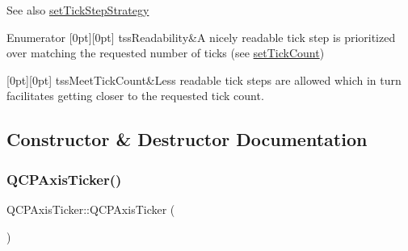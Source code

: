 \begin{DoxySeeAlso}{See also}
\mbox{\hyperlink{class_q_c_p_axis_ticker_a73b1d847c1a12159af6bfda4ebebe7d5}{set\+Tick\+Step\+Strategy}} 
\end{DoxySeeAlso}
\begin{DoxyEnumFields}{Enumerator}
[0pt][0pt]{}\mbox{\label{class_q_c_p_axis_ticker_ab6d2f9d9477821623ac9bc4b21ddf49aa9002aa2fd5633ab5556c71a26fed63a8}} 
tss\+Readability&A nicely readable tick step is prioritized over matching the requested number of ticks (see \mbox{\hyperlink{class_q_c_p_axis_ticker_a47752abba8293e6dc18491501ae34008}{set\+Tick\+Count}}) \\
\hline

[0pt][0pt]{}\mbox{\label{class_q_c_p_axis_ticker_ab6d2f9d9477821623ac9bc4b21ddf49aa770312b6b9b0c64a37ceeba96e0cd7f2}} 
tss\+Meet\+Tick\+Count&Less readable tick steps are allowed which in turn facilitates getting closer to the requested tick count. \\
\hline

\end{DoxyEnumFields}


\subsection{Constructor \& Destructor Documentation}
\mbox{\label{class_q_c_p_axis_ticker_a8fcf23c79ebd72202fe79253f9f01ea8}} 
\subsubsection{\texorpdfstring{Q\+C\+P\+Axis\+Ticker()}{QCPAxisTicker()}}
{\footnotesize\ttfamily Q\+C\+P\+Axis\+Ticker\+::\+Q\+C\+P\+Axis\+Ticker (\begin{DoxyParamCaption}{ }\end{DoxyParamCaption})}

